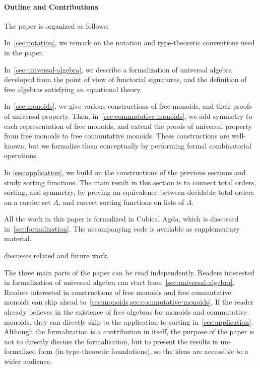 \paragraph*{Outline and Contributions}
The paper is organized as follows:
\begin{myitemize}
  \item In~\cref{sec:notation}, we remark on the notation and type-theoretic conventions used in the paper.
  \item In~\cref{sec:universal-algebra}, we describe a formalization of universal algebra developed from the point of view
        of functorial signatures, and the definition of free algebras satisfying an equational theory.
  \item In~\cref{sec:monoids}, we give various constructions of free monoids, and their proofs of universal property.
        Then, in~\cref{sec:commutative-monoids}, we add symmetry to each representation of free monoids,
        and extend the proofs of universal property from free monoids to free commutative monoids.
        These constructions are well-known, but we formalize them conceptually by performing formal combinatorial operations.
  \item In \cref{sec:application}, we build on the constructions of the previous sections and study sorting functions.
        The main result in this section is to connect total orders, sorting, and symmetry,
        by proving an equivalence between decidable total orders on a carrier set $A$,
        and correct sorting functions on lists of $A$.
  \item All the work in this paper is formalized in Cubical Agda, which is discussed in~\cref{sec:formalization}.
        The accompanying code is available as supplementary material.
  \item {} discusses related and future work.
\end{myitemize}

The three main parts of the paper can be read independently.
%
Readers interested in formalization of universal algebra can start from~\cref{sec:universal-algebra}.
%
Readers interested in constructions of free monoids and free commutative monoids can skip ahead
to~\cref{sec:monoids,sec:commutative-monoids}.
%
If the reader already believes in the existence of free algebras for monoids and commutative monoids,
they can directly skip to the application to sorting in~\cref{sec:application}.
%
Although the formalization is a contribution in itself, the purpose of the paper is not to directly discuss the
formalization, but to present the results in un-formalized form (in type-theoretic foundations), so the ideas are
accessible to a wider audience.
